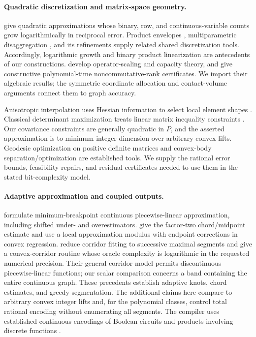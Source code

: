 \paragraph{Quadratic discretization and matrix-space geometry.}
\citet{beach2022} give quadratic approximations whose binary, row, and
continuous-variable counts grow logarithmically in reciprocal error.
Product envelopes \citep{mccormick1976}, multiparametric disaggregation
\citep{teles2013}, and its refinements \citep{beach2024,beach2024b} supply
related shared discretization tools. Accordingly, logarithmic growth and
binary product linearization are antecedents of our constructions.
\citet{ggow2020} develop operator-scaling and capacity theory, and
\citet{iqs2018} give constructive polynomial-time noncommutative-rank
certificates. We import their algebraic results; the symmetric coordinate
allocation and contact-volume arguments connect them to graph accuracy.

Anisotropic interpolation uses Hessian information to select local element
shapes \citep{cao2007}. Classical determinant maximization treats linear
matrix inequality constraints \citep{vandenberghe1998}. Our covariance
constraints are generally quadratic in $P$, and the asserted approximation
is to minimum integer dimension over arbitrary convex lifts.
Geodesic optimization on positive definite matrices
\citep{sra2013,zhang2016} and convex-body separation/optimization
\citep{gls1981} are established tools. We supply the rational error bounds,
feasibility repairs, and residual certificates needed to use them in the
stated bit-complexity model.

\paragraph{Adaptive approximation and coupled outputs.}
\citet{rebennack2015} formulate minimum-breakpoint continuous
piecewise-linear approximation, including shifted under- and
overestimators. \citet[Lemma 2.1]{simchowitz2018} give the factor-two
chord/midpoint estimate and use a local approximation modulus with endpoint
corrections in convex regression. \citet[Sections 3--4]{codsi2025} reduce
corridor fitting to successive maximal segments and give a convex-corridor
routine whose oracle complexity is logarithmic in the requested numerical
precision. Their general corridor model permits discontinuous
piecewise-linear functions; our scalar comparison concerns a band
containing the entire continuous graph. These precedents establish
adaptive knots, chord estimates, and greedy segmentation. The additional
claims here compare to arbitrary convex integer lifts and, for the
polynomial classes, control total rational encoding without enumerating
all segments. The compiler uses established continuous encodings of
Boolean circuits \citep{avis2019} and products involving discrete
functions \citep{adams2012}.

